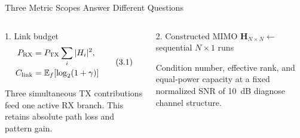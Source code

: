 \begin{frame}[t]{Three Metric Scopes Answer Different Questions}
\scriptsize
\begin{columns}[T,onlytextwidth]
  \begin{block}{1. Link budget}
    \centering
    \begin{equation*}
      \begin{aligned}
        P_{\rm RX}&=P_{\rm TX}\sum_i|H_i|^2,\\[-1pt]
        C_{\rm link}&=\mathbb E_f[\log_2(1+\gamma)]
      \end{aligned}
      \tag{3.1}
    \end{equation*}
    \vspace{-0.4em}
    \raggedright
    Three simultaneous TX contributions feed one active RX branch. This retains
    absolute path loss and pattern gain.
  \end{block}

  \begin{block}{2. Constructed MIMO}
    \centering
    $\mathbf H_{N\times N}\leftarrow$ sequential $N\times1$ runs\par\smallskip
    \raggedright
    Condition number, effective rank, and equal-power capacity at a fixed
    normalized SNR of 10~dB diagnose channel structure.
  \end{block}


\end{columns}
\end{frame}
